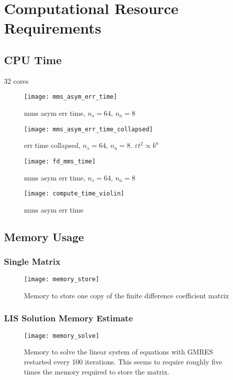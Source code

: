 \section{Computational Resource Requirements}
\subsection{CPU Time}
32 cores

\begin{figure}[H]
  \centering
  \texttt{[image: mms\_asym\_err\_time]}
  \caption{mms asym err time, $n_s=64$, $n_a=8$}
  \label{fig:mms_asym_err_time}
\end{figure}

\begin{figure}[H]
  \centering
  \texttt{[image: mms\_asym\_err\_time\_collapsed]}
  \caption{err time collapsed, $n_s=64$, $n_a=8$. $\varepsilon t^2 \propto b^n$}
  \label{fig:mms_asym_err_time_collapsed}
\end{figure}

\begin{figure}[H]
  \centering
  \texttt{[image: fd\_mms\_time]}
  \caption{mms asym err time, $n_s=64$, $n_a=8$}
  \label{fig:fd_mms_time}
\end{figure}

\begin{figure}[H]
  \centering
  \texttt{[image: compute\_time\_violin]}
  \caption{mms asym err time}
  \label{fig:compute_time_violin}
\end{figure}

\subsection{Memory Usage}
\subsubsection{Single Matrix}
\begin{figure}[H]
  \centering
  \texttt{[image: memory\_store]}
  \caption{Memory to store one copy of the finite difference coefficient matrix}
  \label{fig:memory_store}
\end{figure}

\subsubsection{LIS Solution Memory Estimate}
\begin{figure}[H]
  \centering
  \texttt{[image: memory\_solve]}
  \caption{Memory to solve the linear system of equations with GMRES restarted every 100 iterations. This seems to require roughly five times the memory required to store the matrix.}
  \label{fig:memory_solve}
\end{figure}


